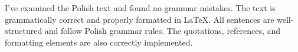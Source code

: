 I've examined the Polish text and found no grammar mistakes. The text is grammatically correct and properly formatted in LaTeX. All sentences are well-structured and follow Polish grammar rules. The quotations, references, and formatting elements are also correctly implemented.